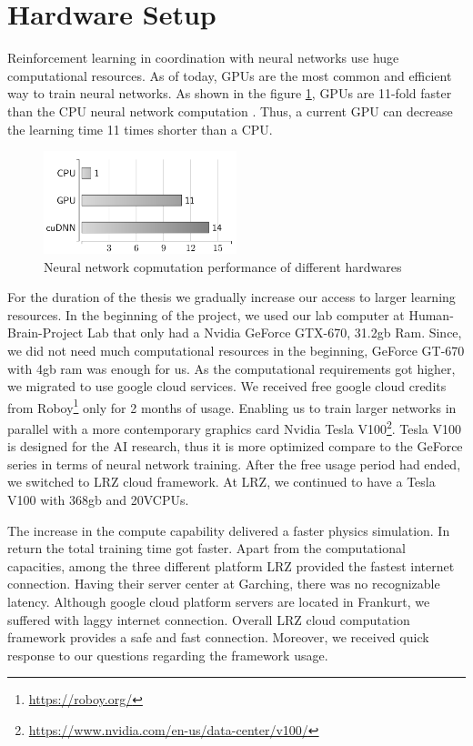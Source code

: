 \section{Hardware Setup}

Reinforcement learning in coordination with neural networks use huge computational resources. As of today, GPUs are the most common and efficient way to train neural networks. As shown in the figure \ref{fig:cpuvsgpu}, GPUs are 11-fold faster than the CPU neural network computation \cite{Schlegel2015}. Thus, a current GPU can decrease the learning time 11 times shorter than a CPU. 

\begin{figure}[htbp]
    \centering
    \includegraphics[width=0.5\textwidth]{figures/cpuvsgpu}
    \caption{ Neural network copmutation performance of different hardwares}
    \label{fig:cpuvsgpu}
\end{figure}

For the duration of the thesis we gradually increase our access to larger learning resources. In the beginning of the project, we used our lab computer at Human-Brain-Project Lab that only had a Nvidia GeForce GTX-670, 31.2gb Ram. Since, we did not need much computational resources in the beginning, GeForce GT-670 with 4gb ram was enough for us. As the computational requirements got higher, we migrated to use google cloud services. We received free google cloud credits from Roboy\footnote{\url{https://roboy.org/}} only for 2 months of usage. Enabling us to train larger networks in parallel with a more contemporary graphics card Nvidia Tesla V100\footnote{\url{https://www.nvidia.com/en-us/data-center/v100/}}. Tesla V100 is designed for the AI research, thus it is more optimized compare to the GeForce series in terms of neural network training. After the free usage period had ended, we switched to LRZ cloud framework. At LRZ, we continued to have a Tesla V100 with 368gb and 20VCPUs. 

The increase in the compute capability delivered a faster physics simulation. In return the total training time got faster. Apart from the computational capacities, among the three different platform LRZ provided the fastest internet connection. Having their server center at Garching, there was no recognizable latency. Although google cloud platform servers are located in Frankurt, we suffered with laggy internet connection. 
Overall LRZ cloud computation framework provides a safe and fast connection. Moreover, we received quick response to our questions regarding the framework usage.

